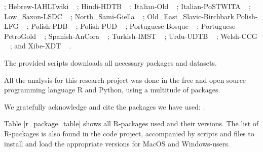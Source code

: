 \documentclass[USenglish]{article}
\providecommand{\DIFaddbegin}{} %
\providecommand{\DIFaddend}{} %
\providecommand{\DIFaddincludegraphics}[2][]{{\color{blue}\fbox{\DIFOincludegraphics[#1]{#2}}}} %
\DeclareRobustCommand{\DIFaddbegin}{\DIFOaddbegin \let\includegraphics\DIFaddincludegraphics} %
\DeclareRobustCommand{\DIFaddend}{\DIFOaddend \let\includegraphics\DIFOincludegraphics} %
\begin{document}
{; 
    Hebrew-IAHLTwiki \mbox{%
\citep{zeldes_secondwave_2022}}\hskip0pt%
; 
    Hindi-HDTB \mbox{%
\citep{bhat_hindiurdu_2017, palmer_hindi_2009}}\hskip0pt%
; 
    Italian-Old \mbox{%
\citep{corbetta_highway_2023, alighieri_commedia_1994}}\hskip0pt%
; 
    Italian-PoSTWITA \mbox{%
\citep{sanguinetti_postwita-ud_2018, sanguinetti_treebanking_2023, sanguinetti_annotating_2017, bosco_overview_2016}}\hskip0pt%
; 
    Low\_Saxon-LSDC \mbox{%
\citep{siewert_low_2024}}\hskip0pt%
; 
    North\_Sami-Giella \mbox{%
\citep{sheyanova_annotation_2017}}\hskip0pt%
; 
    Old\_East\_Slavic-Birchbark
     Polish-LFG \mbox{%
\citep{patejuk_lexical_2018}}\hskip0pt%
; 
     Polish-PDB \mbox{%
\citep{wroblewska_extended_2018}}\hskip0pt%
; 
     Polish-PUD \mbox{%
\citep{wroblewska_extended_2018}}\hskip0pt%
; 
     Portuguese-Bosque \mbox{%
\citep{rademaker_universal_2017}}\hskip0pt%
; 
     Portuguese-PetroGold \mbox{%
\citep{de_souza_polishing_2022}}\hskip0pt%
; 
     Spanish-AnCora \mbox{%
\citep{taule_ancora_2008}}\hskip0pt%
; 
     Turkish-IMST \mbox{%
\citep{sulubacak_implementing_2018, sulubacak_universal_2016}}\hskip0pt%
; 
     Urdu-UDTB \mbox{%
\citep{bhat_hindiurdu_2017}}\hskip0pt%
; 
     Welsh-CCG \mbox{%
\citep{heinecke_development_2019}}\hskip0pt%
; 
   and  Xibe-XDT \mbox{%
\citep{zhou_universal_2020}}\hskip0pt%
.
}\DIFaddend 

The provided scripts downloads all necessary packages and datasets.

All the analysis for this research project was done in the free and open source programming language R and Python, using a multitude of packages. 

We gratefully acknowledge and cite the packages we have used: .

Table \ref{r_package_table} shows all R-packages used and their versions. The list of R-packages is also found in the code project, accompanied by scripts and files to install and load the appropriate versions for MacOS and Windows-users.



\DIFaddbegin \FloatBarrier
\newpage
\end{document}
